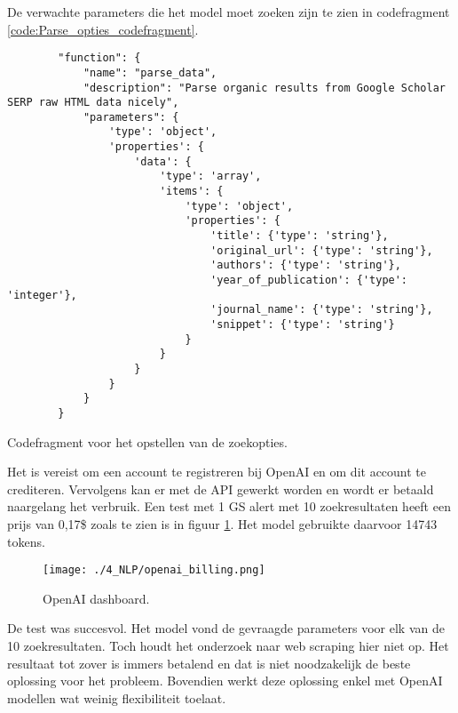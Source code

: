 De verwachte parameters die het model moet zoeken zijn te zien in codefragment \ref{code:Parse_opties_codefragment}.\\
\begin{listing}
    \begin{verbatim}
        "function": {
            "name": "parse_data",
            "description": "Parse organic results from Google Scholar SERP raw HTML data nicely",
            "parameters": {
                'type': 'object',
                'properties': {
                    'data': {
                        'type': 'array',
                        'items': {
                            'type': 'object',
                            'properties': {
                                'title': {'type': 'string'},
                                'original_url': {'type': 'string'},
                                'authors': {'type': 'string'},
                                'year_of_publication': {'type': 'integer'},
                                'journal_name': {'type': 'string'},
                                'snippet': {'type': 'string'}
                            }
                        }
                    }
                }
            }
        }
    \end{verbatim}
    \caption[Parse opties codefragment]{Codefragment voor het opstellen van de zoekopties.}
    \label{code:Parse_opties_codefragment}
\end{listing}
Het is vereist om een account te registreren bij OpenAI en om dit account te crediteren. Vervolgens kan er met de API gewerkt worden en wordt er betaald naargelang het verbruik.
Een test met 1 GS alert met 10 zoekresultaten heeft een prijs van 0,17\$ zoals te zien is in figuur \ref{fig:OpenAI_dashboard}. Het model gebruikte daarvoor 14743 tokens. 
\begin{figure}
    \centering
    \texttt{[image: ./4\_NLP/openai\_billing.png]}
    \caption[OpenAI dashboard.]{\label{fig:OpenAI_dashboard}OpenAI dashboard.}
\end{figure}
De test was succesvol. Het model vond de gevraagde parameters voor elk van de 10 zoekresultaten. Toch houdt het onderzoek naar web scraping hier niet op. Het resultaat tot zover is immers betalend en dat is niet noodzakelijk de beste oplossing voor het probleem. Bovendien werkt deze oplossing enkel met OpenAI modellen wat weinig flexibiliteit toelaat.

